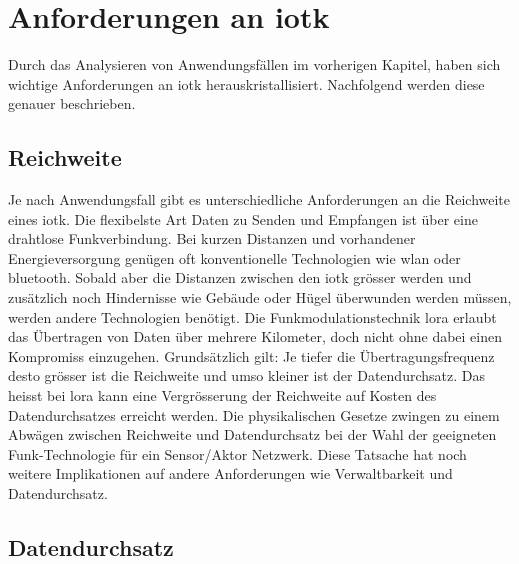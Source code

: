 \chapter{Anforderungen an \gls{iotk}}

Durch das Analysieren von Anwendungsfällen im vorherigen Kapitel, haben sich wichtige Anforderungen an \gls{iotk} herauskristallisiert. Nachfolgend werden diese genauer beschrieben.

\section{Reichweite}

Je nach Anwendungsfall gibt es unterschiedliche Anforderungen an die Reichweite eines \gls{iotk}. Die flexibelste Art Daten zu Senden und Empfangen ist über eine drahtlose Funkverbindung. Bei kurzen Distanzen und vorhandener Energieversorgung genügen oft konventionelle Technologien wie \gls{wlan} oder \gls{bluetooth}. Sobald aber die Distanzen zwischen den \gls{iotk} grösser werden und zusätzlich noch Hindernisse wie Gebäude oder Hügel überwunden werden müssen, werden andere Technologien benötigt. Die Funkmodulationstechnik \gls{lora} erlaubt das Übertragen von Daten über mehrere Kilometer, doch nicht ohne dabei einen Kompromiss einzugehen. Grundsätzlich gilt: Je tiefer die Übertragungsfrequenz desto grösser ist die Reichweite und umso kleiner ist der Datendurchsatz. Das heisst bei \gls{lora} kann eine Vergrösserung der Reichweite auf Kosten des Datendurchsatzes erreicht werden. Die physikalischen Gesetze zwingen zu einem Abwägen zwischen Reichweite und Datendurchsatz bei der Wahl der geeigneten Funk-Technologie für ein Sensor/Aktor Netzwerk. Diese Tatsache hat noch weitere Implikationen auf andere Anforderungen wie Verwaltbarkeit und Datendurchsatz.

\section{Datendurchsatz}

